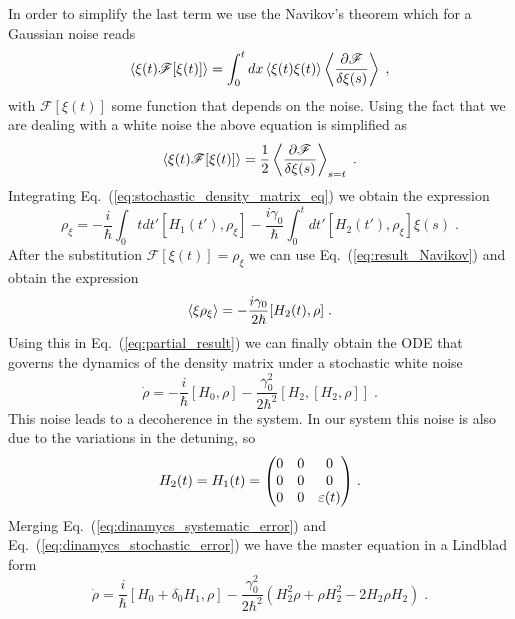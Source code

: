 \documentclass[a4paper,11pt]{article}
\begin{document}
In order to simplify the last term we use the Navikov's theorem which for a Gaussian noise reads
\begin{equation}
	\expval{\xi(t)\mathscr{F}[\xi(t)]}=\int_0^t dx\expval{\xi(t)\xi(t)}\expval{\frac{\partial \mathscr{F}}{\delta \xi(s)}}\;,
\end{equation}
with $\mathscr{F}[\xi(t)]$ some function that depends on the noise. Using the fact that we are dealing with a white noise the above equation is simplified as
\begin{equation}
	\expval{\xi(t)\mathscr{F}[\xi(t)]}=\frac{1}{2}\expval{\frac{\partial \mathscr{F}}{\delta \xi(s)}}_{s=t}\; .
	\label{eq:result_Navikov}
\end{equation}
Integrating Eq.~(\ref{eq:stochastic_density_matrix_eq}) we obtain the expression
\begin{equation}
	\rho_\xi=-\frac{i}{\hbar}\int_0t dt'[H_1(t'),\rho_\xi]-\frac{i\gamma_0}{\hbar}\int_0^t dt'[H_2(t'),\rho_\xi]\xi(s)\; .
\end{equation}
After the substitution $\mathscr{F}[\xi(t)]=\rho_\xi$ we can use Eq.~(\ref{eq:result_Navikov}) and obtain the expression
\begin{equation}
	\expval{\xi\rho_\xi}=-\frac{i\gamma_0}{2\hbar}[H_2(t),\rho]\; .
\end{equation}
Using this in Eq.~(\ref{eq:partial_result}) we can finally obtain the ODE that governs the dynamics of the density matrix under a stochastic white noise
\begin{equation}
	\dot{\rho}=-\frac{i}{\hbar}[H_0,\rho]-\frac{\gamma_0^2}{2\hbar^2}[H_2,[H_2,\rho]]\; .
	\label{eq:dinamycs_stochastic_error}
\end{equation}
This noise leads to a decoherence in the system. In our system this noise is also due to the variations in the detuning, so
\begin{equation}
	H_2(t)=H_1(t)=\mqty(0 & 0 & 0 \\ 0 & 0 & 0 \\ 0 & 0 & \varepsilon(t))\; .
\end{equation}
 Merging Eq.~(\ref{eq:dinamycs_systematic_error}) and Eq.~(\ref{eq:dinamycs_stochastic_error}) we have the master equation in a Lindblad form
\begin{equation}
	\dot{\rho}=\frac{i}{\hbar}[H_0+\delta_0H_1,\rho]-\frac{\gamma_0^2}{2\hbar^2}\left(H_2^2\rho+\rho H_2^2-2H_2\rho H_2\right)\; .
\end{equation}
\end{document}
